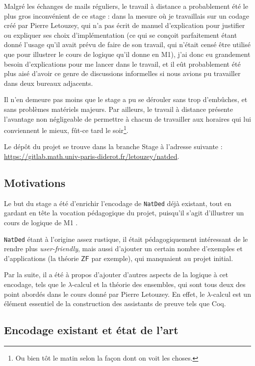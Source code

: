 \documentclass[a4paper]{article}
\newcommand{\ZF}{\mathsf{ZF}}
\theoremstyle{remark}
\theoremstyle{remark}
\theoremstyle{remark}
\theoremstyle{definition}
\theoremstyle{definition}
\theoremstyle{definition}
\begin{document}
Malgré les échanges de mails réguliers, le travail à distance a probablement été le plus gros inconvénient de ce stage : dans la mesure où je travaillais sur un codage créé par Pierre Letouzey, qui n'a pas écrit de manuel d'explication pour justifier ou expliquer ses choix d'implémentation (ce qui se conçoit parfaitement étant donné l'usage qu'il avait prévu de faire de son travail, qui n'était censé être utilisé que pour illustrer le cours de logique qu'il donne en M1), j'ai donc eu grandement besoin d'explications pour me lancer dans le travail, et il eût probablement été plus aisé d'avoir ce genre de discussions informelles si nous avions pu travailler dans deux bureaux adjacents.

Il n'en demeure pas moins que le stage a pu se dérouler sans trop d'embûches, et sans problèmes matériels majeurs. Par ailleurs, le travail à distance présente l'avantage non négligeable de permettre à chacun de travailler aux horaires qui lui conviennent le mieux, fût-ce tard le soir\footnote{Ou bien tôt le matin selon la façon dont on voit les choses.}.

Le dépôt du projet se trouve dans la branche \og Stage \fg{} à l'adresse suivante : \url{https://gitlab.math.univ-paris-diderot.fr/letouzey/natded}.

\subsection*{Motivations}

Le but du stage a été d'enrichir l'encodage de \verb+NatDed+ déjà existant, tout en gardant en tête la vocation pédagogique du projet, puisqu'il s'agit d'illustrer un cours de logique de M1 \cite{poly}.

\verb+NatDed+ étant à l'origine assez rustique, il était pédagogiquement intéressant de le rendre plus \textit{user-friendly}, mais aussi d'ajouter un certain nombre d'exemples et d'applications (la théorie $\ZF$ par exemple), qui manquaient au projet initial.

Par la suite, il a été à propos d'ajouter d'autres aspects de la logique à cet encodage, tels que le $\lambda$-calcul et la théorie des ensembles, qui sont tous deux des point abordés dans le cours donné par Pierre Letouzey. En effet, le $\lambda$-calcul est un élément essentiel de la construction des assistants de preuve tels que Coq.

\subsection*{Encodage existant et état de l'art}
\end{document}
